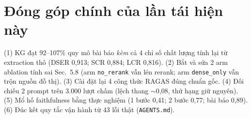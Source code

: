 \documentclass[12pt,a4paper]{article}
\begin{document}
\section{Đóng góp chính của lần tái hiện này}
(1) KG đạt 92--107\% quy mô bài báo \textit{kèm} cả 4 chỉ số chất lượng tính
lại từ extraction thô (DSER 0,913; SCR 0,884; LCR 0,816).
(2) Bắt và sửa 2 arm ablation tính sai Sec.~5.8 (arm \texttt{no\_rerank} vẫn
lén rerank; arm \texttt{dense\_only} vẫn trộn nguồn đồ thị).
(3) Cài đặt lại 4 công thức RAGAS đúng chuẩn gốc.
(4) Đối chiếu 2 prompt trên 3.000 lượt chấm (lệch thang $\sim$0,08, thứ hạng
giữ nguyên).
(5) Mổ hố faithfulness bằng thực nghiệm (1 bước 0,41; 2 bước 0,77; bài báo
0,89).
(6) Đúc kết quy tắc vận hành từ 43 lỗi thật (\texttt{AGENTS.md}).

\end{document}
